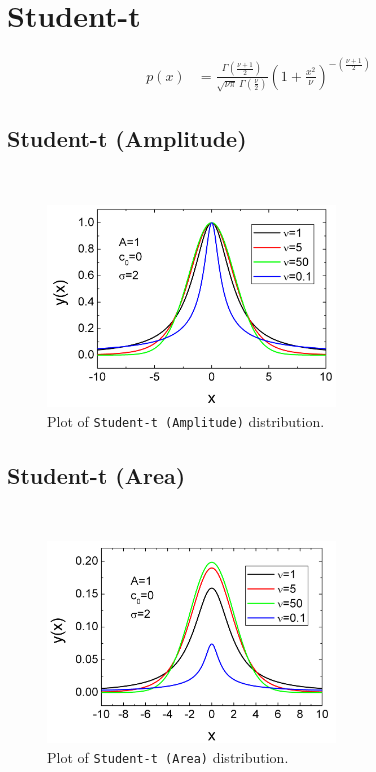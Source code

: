 \section{Student-t}
\label{sec:Student-t}
\begin{align}
p(x) &= \frac{\Gamma(\frac{\nu+1}{2})} {\sqrt{\nu\pi}\,\Gamma(\frac{\nu}{2})} \left(1+\frac{x^2}{\nu} \right)^{-(\frac{\nu+1}{2})}
\end{align}

\subsection{Student-t (Amplitude)} ~\\
\label{sec:Student-tAmplitude}
\begin{figure}[htb]
\begin{center}
\includegraphics[width=0.6824\textwidth]{StudenttAmplitude.png}
\end{center}
\caption{Plot of \texttt{Student-t (Amplitude)} distribution.}
\label{fig:Student-tAmplitude}
\end{figure}

\clearpage

\subsection{Student-t (Area)} ~\\
\label{sec:Student-tArea}
\begin{figure}[htb]
\begin{center}
\includegraphics[width=0.6824\textwidth]{StudenttArea.png}
\end{center}
\caption{Plot of \texttt{Student-t (Area)} distribution.}
\label{fig:Student-tArea}
\end{figure}


